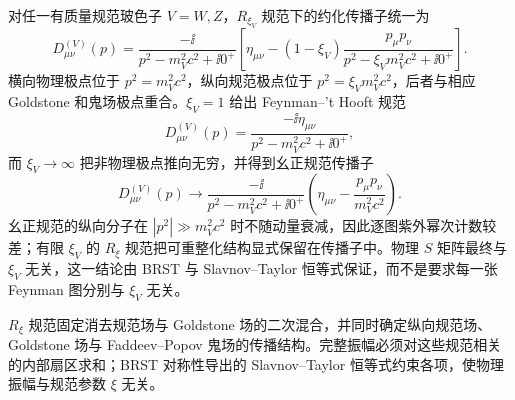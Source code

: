 对任一有质量规范玻色子 $V=W,Z$，$R_{\xi_V}$ 规范下的约化传播子统一为
\begin{equation}
 {
 D^{(V)}_{\mu\nu}(p)
 =\frac{-\ii}{p^2-m_V^2c^2+\ii0^+}
 \left[
 \eta_{\mu\nu}
 -(1-\xi_V)
 \frac{p_\mu p_\nu}{p^2-\xi_Vm_V^2c^2+\ii0^+}
 \right].}
 \label{eq:sm-rxi-massive-vector-propagator-dp41}
\end{equation}
横向物理极点位于 $p^2=m_V^2c^2$，纵向规范极点位于 $p^2=\xi_Vm_V^2c^2$，后者与相应 Goldstone 和鬼场极点重合。$\xi_V=1$ 给出 Feynman--'t Hooft 规范
\begin{equation*}
 D_{\mu\nu}^{(V)}(p)
 =\frac{-\ii\eta_{\mu\nu}}{p^2-m_V^2c^2+\ii0^+},
\end{equation*}
而 $\xi_V\to\infty$ 把非物理极点推向无穷，并得到幺正规范传播子
\begin{equation*}
 D_{\mu\nu}^{(V)}(p)
 \longrightarrow
 \frac{-\ii}{p^2-m_V^2c^2+\ii0^+}
 \left(\eta_{\mu\nu}-\frac{p_\mu p_\nu}{m_V^2c^2}\right).
\end{equation*}
幺正规范的纵向分子在 $|p^2|\gg m_V^2c^2$ 时不随动量衰减，因此逐图紫外幂次计数较差；有限 $\xi_V$ 的 $R_\xi$ 规范把可重整化结构显式保留在传播子中。物理 $S$ 矩阵最终与 $\xi_V$ 无关，这一结论由 BRST 与 Slavnov--Taylor 恒等式保证，而不是要求每一张 Feynman 图分别与 $\xi_V$ 无关。

\label{fig:sm-rxi-pole-structure-dp11}
$R_\xi$ 规范固定消去规范场与 Goldstone 场的二次混合，并同时确定纵向规范场、Goldstone 场与 Faddeev--Popov 鬼场的传播结构。完整振幅必须对这些规范相关的内部扇区求和；BRST 对称性导出的 Slavnov--Taylor 恒等式约束各项，使物理振幅与规范参数 $\xi$ 无关。
